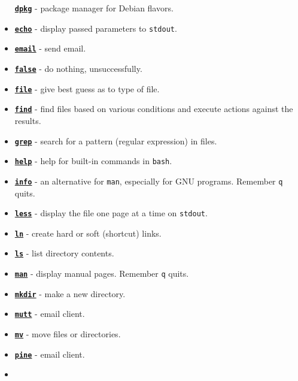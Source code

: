 \documentclass[10pt,]{book}
\numberwithin{figure}{chapter}
\begin{document}
\begin{itemize}
  \href{http://linux.die.net/man/1/dpkg}{\textbf{\texttt{dpkg}}} -
  package manager for Debian flavors.
\item
  \href{http://linux.die.net/man/1/echo}{\textbf{\texttt{echo}}} -
  display passed parameters to \texttt{stdout}.
\item
  \href{http://linux.die.net/man/1/email}{\textbf{\texttt{email}}} -
  send email.
\item
  \href{http://linux.die.net/man/1/false}{\textbf{\texttt{false}}} - do
  nothing, unsuccessfully.
\item
  \href{http://linux.die.net/man/1/file}{\textbf{\texttt{file}}} - give
  best guess as to type of file.
\item
  \href{http://linux.die.net/man/1/find}{\textbf{\texttt{find}}} - find
  files based on various conditions and execute actions against the
  results.
\item
  \href{http://linux.die.net/man/1/grep}{\textbf{\texttt{grep}}} -
  search for a pattern (regular expression) in files.
\item
  \href{http://linux.die.net/man/1/help}{\textbf{\texttt{help}}} - help
  for built-in commands in \texttt{bash}.
\item
  \href{http://linux.die.net/man/1/info}{\textbf{\texttt{info}}} - an
  alternative for \texttt{man}, especially for GNU programs. Remember
  \texttt{q} quits.
\item
  \href{http://linux.die.net/man/1/less}{\textbf{\texttt{less}}} -
  display the file one page at a time on \texttt{stdout}.
\item
  \href{http://linux.die.net/man/1/ln}{\textbf{\texttt{ln}}} - create
  hard or soft (shortcut) links.
\item
  \href{http://linux.die.net/man/1/ls}{\textbf{\texttt{ls}}} - list
  directory contents.
\item
  \href{http://linux.die.net/man/1/man}{\textbf{\texttt{man}}} - display
  manual pages. Remember \texttt{q} quits.
\item
  \href{http://linux.die.net/man/1/mkdir}{\textbf{\texttt{mkdir}}} -
  make a new directory.
\item
  \href{http://linux.die.net/man/1/mutt}{\textbf{\texttt{mutt}}} - email
  client.
\item
  \href{http://linux.die.net/man/1/mv}{\textbf{\texttt{mv}}} - move
  files or directories.
\item
  \href{http://linux.die.net/man/1/pine}{\textbf{\texttt{pine}}} - email
  client.
\item

\end{itemize}
\end{document}
